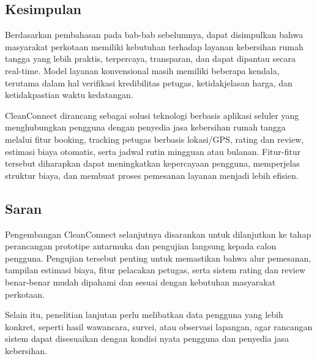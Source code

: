 \subsection{Kesimpulan}

Berdasarkan pembahasan pada bab-bab sebelumnya, dapat disimpulkan bahwa masyarakat perkotaan memiliki kebutuhan terhadap layanan kebersihan rumah tangga yang lebih praktis, terpercaya, transparan, dan dapat dipantau secara real-time. Model layanan konvensional masih memiliki beberapa kendala, terutama dalam hal verifikasi kredibilitas petugas, ketidakjelasan harga, dan ketidakpastian waktu kedatangan.

CleanConnect dirancang sebagai solusi teknologi berbasis aplikasi seluler yang menghubungkan pengguna dengan penyedia jasa kebersihan rumah tangga melalui fitur booking, tracking petugas berbasis lokasi/GPS, rating dan review, estimasi biaya otomatis, serta jadwal rutin mingguan atau bulanan. Fitur-fitur tersebut diharapkan dapat meningkatkan kepercayaan pengguna, memperjelas struktur biaya, dan membuat proses pemesanan layanan menjadi lebih efisien.

\subsection{Saran}

Pengembangan CleanConnect selanjutnya disarankan untuk dilanjutkan ke tahap perancangan prototipe antarmuka dan pengujian langsung kepada calon pengguna. Pengujian tersebut penting untuk memastikan bahwa alur pemesanan, tampilan estimasi biaya, fitur pelacakan petugas, serta sistem rating dan review benar-benar mudah dipahami dan sesuai dengan kebutuhan masyarakat perkotaan.

Selain itu, penelitian lanjutan perlu melibatkan data pengguna yang lebih konkret, seperti hasil wawancara, survei, atau observasi lapangan, agar rancangan sistem dapat disesuaikan dengan kondisi nyata pengguna dan penyedia jasa kebersihan.
